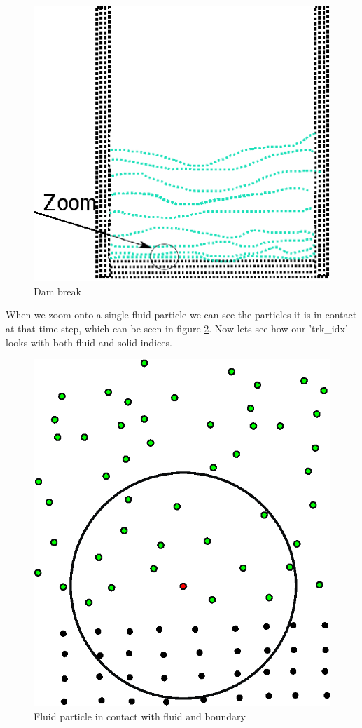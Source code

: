 \begin{figure}[H]
\centering
\includegraphics{figures/db.eps}
\caption{Dam break\label{fig:db}}
\end{figure}

When we zoom onto a single fluid particle we can see the particles it is in
contact at that time step, which can be seen in figure
\ref{fig:par_cntct_fluid_boundary}. Now lets see how our 'trk\_idx' looks with
both fluid and solid indices.

\begin{figure}[H]
\centering
\includegraphics[scale=0.5]{figures/particle_influenced.eps}
\caption{Fluid particle in contact with fluid and boundary\label{fig:par_cntct_fluid_boundary}}
\end{figure}

